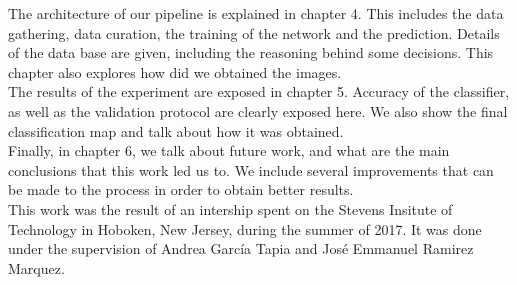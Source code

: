 The architecture of our pipeline is explained in chapter 4. This includes the data gathering, data curation, the training of the network and the prediction. Details of the data base are given, including the reasoning behind some decisions. This chapter also explores how did we obtained the images.\\

The results of the experiment are exposed in chapter 5. Accuracy of the classifier, as well as the validation protocol are clearly exposed here. We also show the final classification map and talk about how it was obtained.\\

Finally, in chapter 6, we talk about future work, and what are the main conclusions that this work led us to. We include several improvements that can be made to the process in order to obtain better results.\\

This work was the result of an intership spent on the Stevens Insitute of Technology in Hoboken, New Jersey, during the summer of 2017. It was done under the supervision of Andrea García Tapia and José Emmanuel Ramirez Marquez.\\